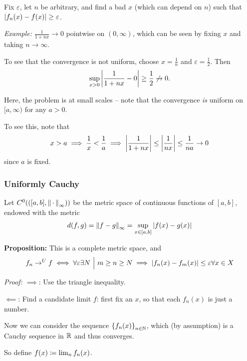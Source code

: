 Fix \(\varepsilon\), let \(n\) be arbitrary, and find a bad \(x\) (which
can depend on \(n\)) such that \({\left\lvert {f_n(x) - f(x)} \right\rvert} \geq \varepsilon\).

\emph{Example:} \(\frac 1 {1 + nx} \to 0\) pointwise on \((0, \infty)\),
which can be seen by fixing \(x\) and taking \(n \to \infty\).

To see that the convergence is not uniform, choose \(x = \frac 1 n\) and
\(\varepsilon = \frac 1 2\). Then
\begin{align*}
\sup_{x > 0} {\left\lvert {\frac 1 {1+nx} - 0} \right\rvert} \geq \frac 1 2 \not\to 0.
\end{align*}

Here, the problem is at small scales -- note that the convergence
\emph{is} uniform on \([a, \infty)\) for any \(a > 0\).

To see this, note that
\begin{align*}
x > a \implies \frac 1 x < \frac 1 a \implies {\left\lvert {\frac 1 {1 + nx}} \right\rvert} \leq {\left\lvert {\frac 1 {nx}} \right\rvert} \leq \frac 1 {na} \to 0
\end{align*} since \(a\) is fixed.

\hypertarget{uniformly-cauchy}{%
\subsubsection{Uniformly Cauchy}\label{uniformly-cauchy}}

Let \(C^0( ( [a,b], {\left\lVert {{\,\cdot\,}} \right\rVert}_\infty))\) be the metric space of
continuous functions of \([a,b]\), endowed with the metric
\begin{align*}
d(f, g) = {\left\lVert {f - g} \right\rVert}_\infty = \sup_{x\in [a,b]} {\left\lvert {f(x) - g(x)} \right\rvert}
\end{align*}

\textbf{Proposition:} This is a complete metric space, and
\begin{align*}
f_n \to^U f \iff \forall\varepsilon \exists N {~\mathrel{\Big|}~} m \geq n \geq N \implies {\left\lvert {f_n(x) - f_m(x)} \right\rvert} \leq\varepsilon \forall x\in X
\end{align*}

\emph{Proof:} \(\implies\): Use the triangle inequality.

\(\impliedby\): Find a candidate limit \(f\): first fix an \(x\), so
that each \(f_n(x)\) is just a number.

Now we can consider the sequence \(\left\{{f_n(x)}\right\}_{n\in{\mathbb{N}}}\), which
(by assumption) is a Cauchy sequence in \({\mathbb{R}}\) and thus converges.

So define \(f(x) \coloneqq \lim_n f_n(x)\).

